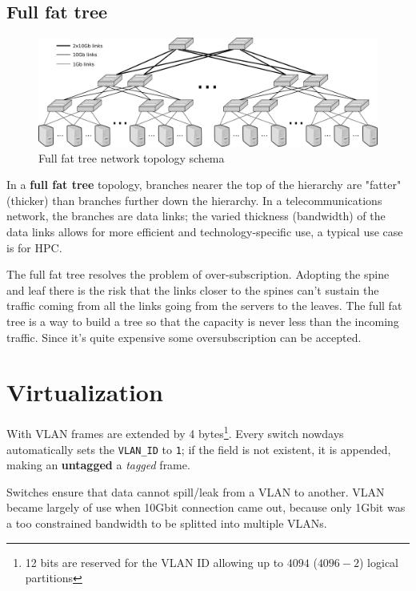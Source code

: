 \subsection{Full fat tree}
\begin{figure}[htbp]
   \centering
   \includegraphics{images/fullfattree_network.png}
   \caption{Full fat tree network topology schema}
   \label{fig:fullfattree_network}
\end{figure}
In a \textbf{full fat tree} topology, branches nearer the top of the hierarchy are "fatter" (thicker) than branches further down the hierarchy. In a telecommunications network, the branches are data links; the varied thickness (bandwidth) of the data links allows for more efficient and technology-specific use, a typical use case is for HPC.

The full fat tree resolves the problem of over-subscription. Adopting
the spine and leaf there is the risk that the links closer to the spines can’t sustain the traffic coming from all the links going from the servers to the leaves. The full fat tree is a way to build a tree so that the capacity is never
less than the incoming traffic. Since it's quite expensive some oversubscription can be accepted.

\section{Virtualization}

With VLAN frames are extended by 4 bytes\footnote{12 bits are reserved for the VLAN ID allowing up to $4094$ ($4096-2$) logical partitions}. Every switch nowdays automatically sets the \texttt{VLAN\_ID} to \texttt{1}; if the field is not existent, it is appended, making an \textbf{untagged} a \textit{tagged} frame.

Switches ensure that data cannot spill/leak from a VLAN to another.
VLAN became largely of use when 10Gbit connection came out, because only 1Gbit was a too constrained bandwidth to be splitted into multiple VLANs. 

